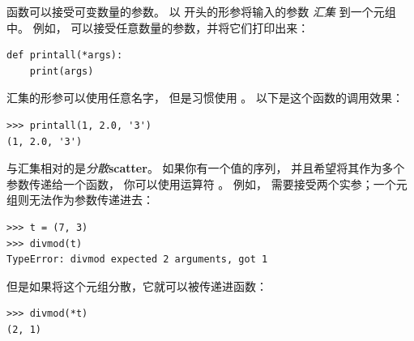 {%

函数可以接受可变数量的参数。 以 {\bf *} 开头的形参将输入的参数 \emph{汇集} 到一个元组中。  
例如，  可以接受任意数量的参数，并将它们打印出来：

\begin{lstlisting}
def printall(*args):
    print(args)
\end{lstlisting}

%

汇集的形参可以使用任意名字， 但是习惯使用 。  
以下是这个函数的调用效果：

\begin{lstlisting}
>>> printall(1, 2.0, '3')
(1, 2.0, '3')
\end{lstlisting}

%

与汇集相对的是\emph{分散}{\bf scatter}。  
如果你有一个值的序列， 并且希望将其作为多个参数传递给一个函数， 
你可以使用运算符 \li{*}。
例如，  需要接受两个实参；一个元组则无法作为参数传递进去：

  

\begin{lstlisting}
>>> t = (7, 3)
>>> divmod(t)
TypeError: divmod expected 2 arguments, got 1
\end{lstlisting}

%

但是如果将这个元组分散，它就可以被传递进函数：

\begin{lstlisting}
>>> divmod(*t)
(2, 1)
\end{lstlisting}

%

}
